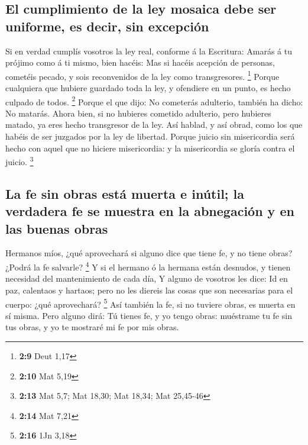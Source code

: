 \hypertarget{el-cumplimiento-de-la-ley-mosaica-debe-ser-uniforme-es-decir-sin-excepciuxf3n}{%
\subsection{El cumplimiento de la ley mosaica debe ser uniforme, es
decir, sin
excepción}\label{el-cumplimiento-de-la-ley-mosaica-debe-ser-uniforme-es-decir-sin-excepciuxf3n}}

 Si en verdad cumplís vosotros la ley real, conforme á la
Escritura: Amarás á tu prójimo como á ti mismo, bien hacéis:
 Mas si hacéis acepción de personas, cometéis pecado, y sois
reconvenidos de la ley como transgresores. \footnote{\textbf{2:9} Deut
  1,17}  Porque cualquiera que hubiere guardado toda la
ley, y ofendiere en un punto, es hecho culpado de todos. \footnote{\textbf{2:10}
  Mat 5,19}  Porque el que dijo: No cometerás adulterio,
también ha dicho: No matarás. Ahora bien, si no hubieres cometido
adulterio, pero hubieres matado, ya eres hecho transgresor de la ley.
 Así hablad, y así obrad, como los que habéis de ser
juzgados por la ley de libertad.  Porque juicio sin
misericordia será hecho con aquel que no hiciere misericordia: y la
misericordia se gloría contra el juicio. \footnote{\textbf{2:13} Mat
  5,7; Mat 18,30; Mat 18,34; Mat 25,45-46}

\hypertarget{la-fe-sin-obras-estuxe1-muerta-e-inuxfatil-la-verdadera-fe-se-muestra-en-la-abnegaciuxf3n-y-en-las-buenas-obras}{%
\subsection{La fe sin obras está muerta e inútil; la verdadera fe se
muestra en la abnegación y en las buenas
obras}\label{la-fe-sin-obras-estuxe1-muerta-e-inuxfatil-la-verdadera-fe-se-muestra-en-la-abnegaciuxf3n-y-en-las-buenas-obras}}

 Hermanos míos, ¿qué aprovechará si alguno dice que tiene
fe, y no tiene obras? ¿Podrá la fe salvarle? \footnote{\textbf{2:14} Mat
  7,21}  Y si el hermano ó la hermana están desnudos, y
tienen necesidad del mantenimiento de cada día,  Y alguno
de vosotros les dice: Id en paz, calentaos y hartaos; pero no les
diereis las cosas que son necesarias para el cuerpo: ¿qué aprovechará?
\footnote{\textbf{2:16} 1Jn 3,18}  Así también la fe, si no
tuviere obras, es muerta en sí misma.  Pero alguno dirá: Tú
tienes fe, y yo tengo obras: muéstrame tu fe sin tus obras, y yo te
mostraré mi fe por mis obras.

